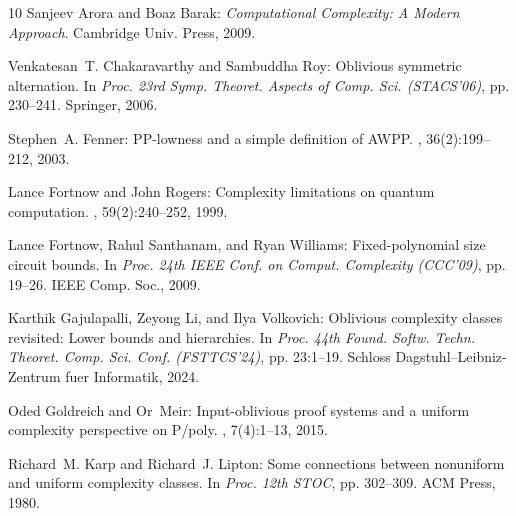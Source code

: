 \begin{thebibliography}{10}
{\sc Sanjeev Arora and Boaz Barak}: {\em Computational Complexity: A Modern
  Approach}.
\newblock Cambridge Univ. Press, 2009.

{\sc Venkatesan~T. Chakaravarthy and Sambuddha Roy}: Oblivious symmetric
  alternation.
\newblock In {\em Proc. 23rd Symp. Theoret. Aspects of Comp. Sci. (STACS'06)},
  pp. 230--241. Springer, 2006.
\newblock [\epfmtdoi{10.1007/11672142\_18}]

{\sc Stephen~A. Fenner}: {PP}-lowness and a simple definition of {AWPP}.
, 36(2):199--212, 2003.
\newblock [\epfmtdoi{10.1007/s00224-002-1089-8}]

{\sc Lance Fortnow and John Rogers}: Complexity limitations on quantum
  computation.
, 59(2):240--252, 1999.

{\sc Lance Fortnow, Rahul Santhanam, and Ryan Williams}: Fixed-polynomial size
  circuit bounds.
\newblock In {\em Proc. 24th IEEE Conf. on Comput. Complexity (CCC'09)}, pp.
  19--26. IEEE Comp. Soc., 2009.

{\sc Karthik Gajulapalli, Zeyong Li, and Ilya Volkovich}: Oblivious complexity
  classes revisited: {L}ower bounds and hierarchies.
\newblock In {\em Proc. 44th Found. Softw. Techn. Theoret. Comp. Sci. Conf.
  (FSTTCS'24)}, pp. 23:1--19. Schloss Dagstuhl--Leibniz-Zentrum fuer
  Informatik, 2024.

{\sc Oded Goldreich and Or~Meir}: Input-oblivious proof systems and a uniform
  complexity perspective on {P}/poly.
, 7(4):1--13, 2015.
\newblock [\epfmtdoi{10.1145/2799645}]

{\sc Richard~M. Karp and Richard~J. Lipton}: Some connections between
  nonuniform and uniform complexity classes.
\newblock In {\em Proc. 12th STOC}, pp. 302--309. ACM Press, 1980.
\newblock [\epfmtdoi{10.1145/800141.804678}]


\end{thebibliography}
